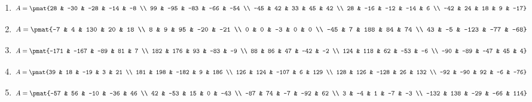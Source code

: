 \begin{enumerate}
\item

\begin{align*}
A = \pmat{28 & -30 & -28 & -14 & -8 \\ 99 & -95 & -83 & -66 & -54 \\ -45 & 42 & 33 & 45 & 42 \\ 28 & -16 & -12 & -14 & 6 \\ -42 & 24 & 18 & 9 & -17}
\end{align*}

\item

\begin{align*}
A = \pmat{-7 & 4 & 130 & 20 & 18 \\ 8 & 9 & 95 & -20 & -21 \\ 0 & 0 & -3 & 0 & 0 \\ -45 & 7 & 188 & 84 & 74 \\ 43 & -5 & -123 & -77 & -68}
\end{align*}

\item

\begin{align*}
A = \pmat{-171 & -167 & -89 & 81 & 7 \\ 182 & 176 & 93 & -83 & -9 \\ 88 & 86 & 47 & -42 & -2 \\ 124 & 118 & 62 & -53 & -6 \\ -90 & -89 & -47 & 45 & 4}
\end{align*}

\item

\begin{align*}
A = \pmat{39 & 18 & -19 & 3 & 21 \\ 181 & 198 & -182 & 9 & 186 \\ 126 & 124 & -107 & 6 & 129 \\ 128 & 126 & -128 & 26 & 132 \\ -92 & -90 & 92 & -6 & -76}
\end{align*}

\item

\begin{align*}
A = \pmat{-57 & 56 & -10 & -36 & 46 \\ 42 & -53 & 15 & 0 & -43 \\ -87 & 74 & -7 & -92 & 62 \\ 3 & -4 & 1 & -7 & -3 \\ -132 & 138 & -29 & -66 & 114}
\end{align*}


\end{enumerate}
